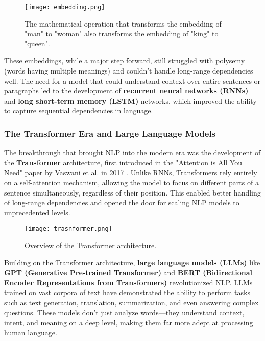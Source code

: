\begin{figure}[!h]
    \centering
    \texttt{[image: embedding.png]}
    \caption{The mathematical operation that transforms the embedding of "man" to "woman" also transforms the embedding of "king" to "queen".}
    \vspace{0.1cm}
    \label{fig:embeddings}
\end{figure}

These embeddings, while a major step forward, still struggled with polysemy (words having multiple meanings) and couldn’t handle long-range dependencies well.
The need for a model that could understand context over entire sentences or paragraphs led to the development of \textbf{recurrent neural networks (RNNs)} \cite{Rumelhart1986LearningIR} and \textbf{long short-term memory (LSTM)} \cite{hochreiter1997long} networks, which improved the ability to capture sequential dependencies in language.

\subsubsection{ The Transformer Era and Large Language Models}

The breakthrough that brought NLP into the modern era was the development of the \textbf{Transformer} architecture, first introduced in the "Attention is All You Need" paper by Vaswani et al. in 2017 \cite{vaswani2017attention}. Unlike RNNs, Transformers rely entirely on a self-attention mechanism, allowing the model to focus on different parts of a sentence simultaneously, regardless of their position.
This enabled better handling of long-range dependencies and opened the door for scaling NLP models to unprecedented levels.

\begin{figure}[!h]
    \centering
    \texttt{[image: trasnformer.png]}
    \caption{Overview of the Transformer architecture.}
    \vspace{0.1cm}
    \label{fig:transformer}
\end{figure}

Building on the Transformer architecture, \textbf{large language models (LLMs)} like \textbf{GPT (Generative Pre-trained Transformer)}\cite{radford2018improving} and \textbf{BERT (Bidirectional Encoder Representations from Transformers)}\cite{devlin2018bert} revolutionized NLP. LLMs trained on vast corpora of text have demonstrated the ability to perform tasks such as text generation, translation, summarization, and even answering complex questions.
These models don’t just analyze words—they understand context, intent, and meaning on a deep level, making them far more adept at processing human language.

